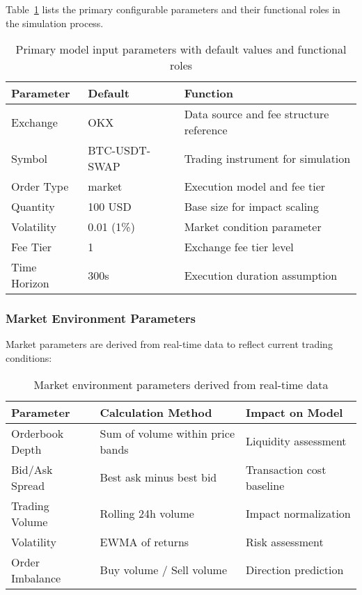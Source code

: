 \documentclass[10pt,twocolumn,a4paper]{IEEEtran}
\begin{document}
Table~\ref{tab:input_params} lists the primary configurable parameters and their functional roles in the simulation process.

\begin{table}[t]
\centering
\begin{tabular}{@{}p{2cm}p{1.5cm}p{4cm}@{}}
\toprule
\textbf{Parameter} & \textbf{Default} & \textbf{Function} \\ \midrule
Exchange & OKX & Data source and fee structure reference \\
Symbol & BTC-USDT-SWAP & Trading instrument for simulation \\
Order Type & market & Execution model and fee tier \\
Quantity & 100 USD & Base size for impact scaling \\
Volatility & 0.01 (1\%) & Market condition parameter \\
Fee Tier & 1 & Exchange fee tier level \\ 
Time Horizon & 300s & Execution duration assumption \\ \bottomrule
\end{tabular}
\caption{Primary model input parameters with default values and functional roles}
\label{tab:input_params}
\end{table}

\subsubsection{Market Environment Parameters}

Market parameters are derived from real-time data to reflect current trading conditions:

\begin{table}[t]
\centering
\begin{tabular}{@{}p{2.5cm}p{2.5cm}p{2.5cm}@{}}
\toprule
\textbf{Parameter} & \textbf{Calculation Method} & \textbf{Impact on Model} \\ \midrule
Orderbook Depth & Sum of volume within price bands & Liquidity assessment \\
Bid/Ask Spread & Best ask minus best bid & Transaction cost baseline \\
Trading Volume & Rolling 24h volume & Impact normalization \\
Volatility & EWMA of returns & Risk assessment \\
Order Imbalance & Buy volume / Sell volume & Direction prediction \\ \bottomrule
\end{tabular}
\caption{Market environment parameters derived from real-time data}
\label{tab:market_params}
\end{table}
\end{document}
